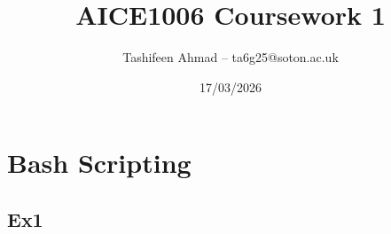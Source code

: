 \documentclass[12pt, a4paper]{report}
\title{AICE1006 Coursework 1}
\author{Tashifeen Ahmad -- ta6g25@soton.ac.uk}
\date{17/03/2026}
\begin{document}
\maketitle
\tableofcontents %
\newpage











\section{Bash Scripting}
\subsection{Ex1}
\end{document}
